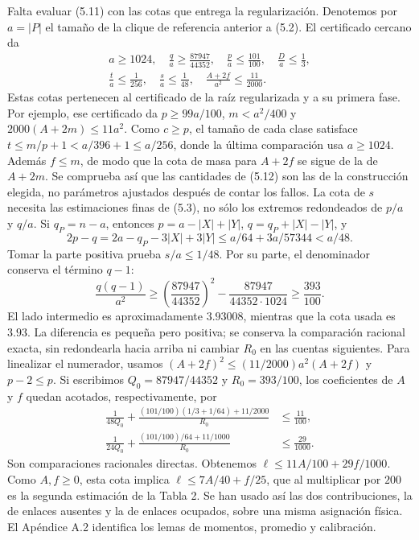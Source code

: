 \documentclass[spanish,11pt,a4paper]{article}
\begin{document}
Falta evaluar (5.11) con las cotas que entrega la regularización. Denotemos por \(a=|P|\) el tamaño de la clique de referencia anterior a (5.2). El certificado cercano da \[
\begin{gathered}
a\ge1024,\quad \frac qa\ge\frac{87947}{44352},\quad
\frac pa\le\frac{101}{100},\quad \frac Da\le\frac13,\\
\frac ta\le\frac1{256},\quad \frac sa\le\frac1{48},\quad
\frac{A+2f}{a^2}\le\frac{11}{2000}.
\end{gathered}
\tag{5.12}
\] Estas cotas pertenecen al certificado de la raíz regularizada y a su primera fase. Por ejemplo, ese certificado da \(p\ge99a/100\), \(m<a^2/400\) y \(2000(A+2m)\le11a^2\). Como \(c\ge p\), el tamaño de cada clase satisface \(t\le m/p+1<a/396+1\le a/256\), donde la última comparación usa \(a\ge1024\). Además \(f\le m\), de modo que la cota de masa para \(A+2f\) se sigue de la de \(A+2m\). Se comprueba así que las cantidades de (5.12) son las de la construcción elegida, no parámetros ajustados después de contar los fallos. La cota de \(s\) necesita las estimaciones finas de (5.3), no sólo los extremos redondeados de \(p/a\) y \(q/a\). Si \(q_P=n-a\), entonces \(p=a-|X|+|Y|\), \(q=q_P+|X|-|Y|\), y \[
2p-q=2a-q_P-3|X|+3|Y|
\le a/64+3a/57344<a/48.
\tag{5.12a}
\] Tomar la parte positiva prueba \(s/a\le1/48\). Por su parte, el denominador conserva el término \(q-1\): \[
\frac{q(q-1)}{a^2}\ge
\left(\frac{87947}{44352}\right)^2
-\frac{87947}{44352\cdot1024}\ge\frac{393}{100}.
\tag{5.13}
\] El lado intermedio es aproximadamente \(3.93008\), mientras que la cota usada es \(3.93\). La diferencia es pequeña pero positiva; se conserva la comparación racional exacta, sin redondearla hacia arriba ni cambiar \(R_0\) en las cuentas siguientes. Para linealizar el numerador, usamos \((A+2f)^2\le(11/2000)a^2(A+2f)\) y \(p-2\le p\). Si escribimos \(Q_0=87947/44352\) y \(R_0=393/100\), los coeficientes de \(A\) y \(f\) quedan acotados, respectivamente, por \[
\begin{aligned}
\frac{1}{48Q_0}
+\frac{(101/100)(1/3+1/64)+11/2000}{R_0}
&\le\frac{11}{100},\\
\frac{1}{24Q_0}
+\frac{(101/100)/64+11/1000}{R_0}
&\le\frac{29}{1000}.
\end{aligned}
\tag{5.14}
\] Son comparaciones racionales directas. Obtenemos \(\ell\le11A/100+29f/1000\). Como \(A,f\ge0\), esta cota implica \(\ell\le7A/40+f/25\), que al multiplicar por \(200\) es la segunda estimación de la Tabla 2. Se han usado así las dos contribuciones, la de enlaces ausentes y la de enlaces ocupados, sobre una misma asignación física. El Apéndice A.2 identifica los lemas de momentos, promedio y calibración.
\end{document}
